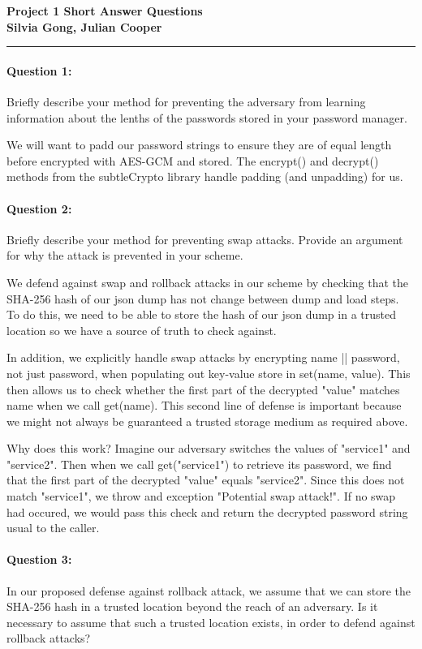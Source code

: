 \documentclass[12pt,letterpaper,twoside]{article}
\begin{document}
{\centering \textbf{Project 1 Short Answer Questions\\ Silvia Gong, Julian Cooper\\}}
\vspace*{-8pt}\noindent\rule{\linewidth}{1pt}

\paragraph{Question 1: } Briefly describe your method for preventing the
adversary from learning information about the lenths of the passwords stored in
your password manager.

We will want to padd our password strings to ensure they are of equal length
before encrypted with AES-GCM and stored. The encrypt() and decrypt() methods
from the subtleCrypto library handle padding (and unpadding) for us.


\paragraph{Question 2: } Briefly describe your method for preventing swap
attacks. Provide an argument for why the attack is prevented in your scheme.

We defend against swap and rollback attacks in our scheme by checking that the
SHA-256 hash of our json dump has not change between dump and load steps. To do
this, we need to be able to store the hash of our json dump in a trusted
location so we have a source of truth to check against.

In addition, we explicitly handle swap attacks by encrypting name || password,
not just password, when populating out key-value store in set(name, value).
This then allows us to check whether the first part of the decrypted "value"
matches name when we call get(name). This second line of defense is important
because we might not always be guaranteed a trusted storage medium as required
above.

Why does this work? Imagine our adversary switches the values of "service1"
and "service2". Then when we call get("service1") to retrieve its password, we
find that the first part of the decrypted "value" equals "service2". Since this
does not match "service1", we throw and exception "Potential swap attack!". If
no swap had occured, we would pass this check and return the decrypted password
string usual to the caller.


\paragraph{Question 3: } In our proposed defense against rollback attack, we
assume that we can store the SHA-256 hash in a trusted location beyond the reach
of an adversary. Is it necessary to assume that such a trusted location exists,
in order to defend against rollback attacks?
\end{document}
